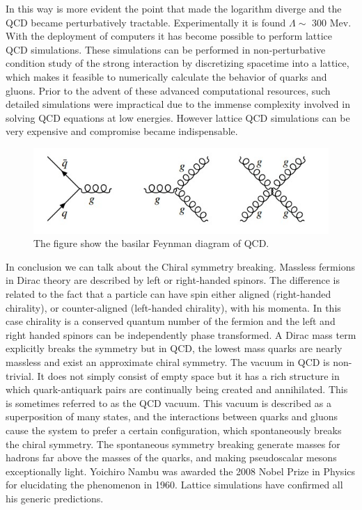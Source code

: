 \documentclass[12pt,a4paper]{book}
\begin{document}
	In this way is more evident the point that made the logarithm diverge and the QCD became perturbatively tractable. Experimentally it is found $\Lambda \sim$ 300 Mev.\cite{Semprini} 
	With the deployment of computers it has become possible to perform lattice QCD simulations. These simulations can be performed in non-perturbative condition study of the strong interaction by discretizing spacetime into a lattice, which makes it feasible to numerically calculate the behavior of quarks and gluons. Prior to the advent of these advanced computational resources, such detailed simulations were impractical due to the immense complexity involved in solving QCD equations at low energies. However lattice QCD simulations can be very expensive and compromise became indispensable. 
	
		\begin{figure}		
		\centering
		\includegraphics[width=0.7\linewidth]{pictures/QCD_vertices.jpeg}
		\caption{The figure show the basilar Feynman diagram of QCD.}
		\label{fig:QCD_vertices} 
	\end{figure}
	
	In conclusion we can talk about the Chiral symmetry breaking. Massless fermions in Dirac theory are described by left or right-handed spinors. The difference is related to the fact that a particle can have spin either aligned (right-handed chirality), or counter-aligned (left-handed chirality), with his momenta. In this case chirality is a conserved quantum number of the fermion and the left and right handed spinors can be independently phase transformed. A Dirac mass term explicitly breaks the symmetry but in QCD, the lowest mass quarks are nearly massless and exist an approximate chiral symmetry. The vacuum in QCD is non-trivial. It does not simply consist of empty space but it has a rich structure in which quark-antiquark pairs are continually being created and annihilated. This is sometimes referred to as the QCD vacuum. This vacuum is described as a superposition of many states, and the interactions between quarks and gluons cause the system to prefer a certain configuration, which spontaneously breaks the chiral symmetry. The spontaneous symmetry breaking generate masses for hadrons far above the masses of the quarks, and making pseudoscalar mesons exceptionally light. Yoichiro Nambu was awarded the 2008 Nobel Prize in Physics for elucidating the phenomenon in 1960. Lattice simulations have confirmed all his generic predictions. 
	
\end{document}
